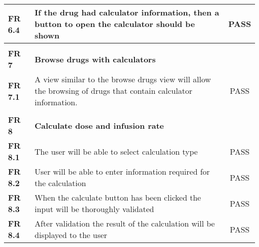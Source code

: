 \begin{center}
\begin{longtable}{| l | p{11cm} | c |}
\textbf{FR 6.4}                 & If the drug had calculator information, then a button to open the calculator should be shown                                                                               & PASS      \\ \hline
\textbf{}                       &                                                                                                                                                                            &           \\ \hline
\textbf{FR 7}                   & \textbf{Browse drugs with calculators}                                                                                                                                     &           \\ \hline
\textbf{FR 7.1}                 & A view similar to the browse drugs view will allow the browsing of drugs that contain calculator information.                                                              & PASS      \\ \hline
\textbf{}                       &                                                                                                                                                                            &           \\ \hline
\textbf{FR 8}                   & \textbf{Calculate dose and infusion rate}                                                                                                                                  &           \\ \hline
\textbf{FR 8.1}                 & The user will be able to select calculation type                                                                                                                           & PASS      \\ \hline
\textbf{FR 8.2}                 & User will be able to enter information required for the calculation                                                                                                        &    PASS       \\ \hline
\textbf{FR 8.3}                 & When the calculate button has been clicked the input will be thoroughly validated                                                                                          & PASS      \\ \hline
\textbf{FR 8.4}                 & After validation the result of the calculation will be displayed to the user                                                                                               & PASS      \\ \hline

\end{longtable}
\end{center}
